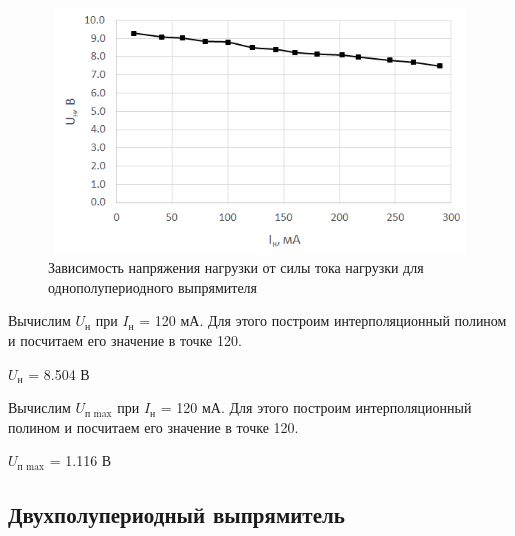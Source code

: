 \begin{figure}[H]
	\begin{center}
		\includegraphics[width=15cm,height=6.5cm]{img/3}
		\caption{Зависимость напряжения нагрузки от силы тока нагрузки для однополупериодного выпрямителя}
		\label{g:3} %
	\end{center}
\end{figure}



Вычислим $U_\text{н}$ при $I_\text{н}$ = 120 мА. Для этого построим интерполяционный полином и посчитаем его значение в точке 120.

$U_\text{н}$ = 8.504 В

Вычислим $U_\text{п max}$ при $I_\text{н}$ = 120 мА. Для этого построим интерполяционный полином и посчитаем его значение в точке 120.

$U_\text{п max}$ = 1.116 В

\newpage
\subsection{Двухполупериодный выпрямитель}

